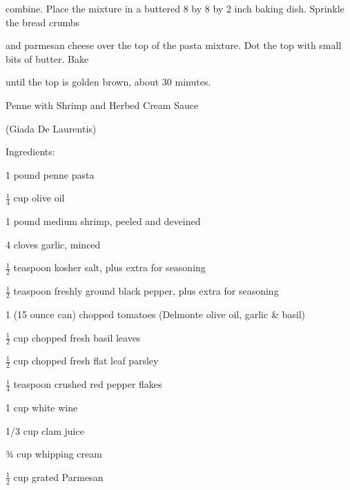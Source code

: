 \documentclass[a4paper,portrait,12pt]{book}
\begin{document}
combine. Place the mixture in a buttered 8 by 8 by 2 inch baking dish. Sprinkle the bread crumbs




and parmesan cheese over the top of the pasta mixture. Dot the top with small bits of butter. Bake




until the top is golden brown, about 30 minutes.







\newpage
Penne with Shrimp and Herbed Cream Sauce




(Giada De Laurentis)




Ingredients:




1 pound penne pasta




$\frac{1}{4}$ cup olive oil




1 pound medium shrimp, peeled and deveined




4 cloves garlic, minced




$\frac{1}{2}$ teaspoon kosher salt, plus extra for seasoning




$\frac{1}{2}$ teaspoon freshly ground black pepper, plus extra for seasoning




1 (15 ounce can) chopped tomatoes (Delmonte olive oil, garlic \& basil)




$\frac{1}{2}$ cup chopped fresh basil leaves




$\frac{1}{2}$ cup chopped fresh flat leaf parsley




$\frac{1}{4}$ teaspoon crushed red pepper flakes




1 cup white wine




1/3 cup clam juice




¾ cup whipping cream




$\frac{1}{2}$ cup grated Parmesan
\end{document}
